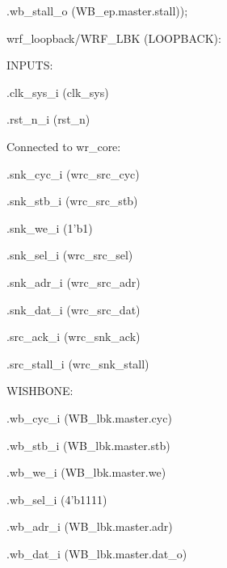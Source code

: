 \begin{dig}
\begin{dig}
\begin{dig}
\begin{dig}
            \item .wb\_stall\_o                 (WB\_ep.master.stall));
            \end{dig}
        \end{dig}
    \end{dig}
\item wrf\_loopback/WRF\_LBK (LOOPBACK): 
    \begin{dig}
    \item INPUTS:
        \begin{dig}
        \item .clk\_sys\_i                  (clk\_sys)
        \item .rst\_n\_i                    (rst\_n)
        \item Connected to wr\_core:
            \begin{dig}
            \item .snk\_cyc\_i                  (wrc\_src\_cyc)
            \item .snk\_stb\_i                  (wrc\_src\_stb)
            \item .snk\_we\_i                   (1'b1)
            \item .snk\_sel\_i                  (wrc\_src\_sel)
            \item .snk\_adr\_i                  (wrc\_src\_adr)
            \item .snk\_dat\_i                  (wrc\_src\_dat)
            \item 
            \item .src\_ack\_i                  (wrc\_snk\_ack)
            \item .src\_stall\_i                (wrc\_snk\_stall)
            \end{dig}
        \item WISHBONE:
            \begin{dig}
            \item .wb\_cyc\_i                   (WB\_lbk.master.cyc)
            \item .wb\_stb\_i                   (WB\_lbk.master.stb)
            \item .wb\_we\_i                    (WB\_lbk.master.we)
            \item .wb\_sel\_i                   (4'b1111)
            \item .wb\_adr\_i                   (WB\_lbk.master.adr)
            \item .wb\_dat\_i                   (WB\_lbk.master.dat\_o)
            \end{dig}

\end{dig}
\end{dig}
\end{dig}
